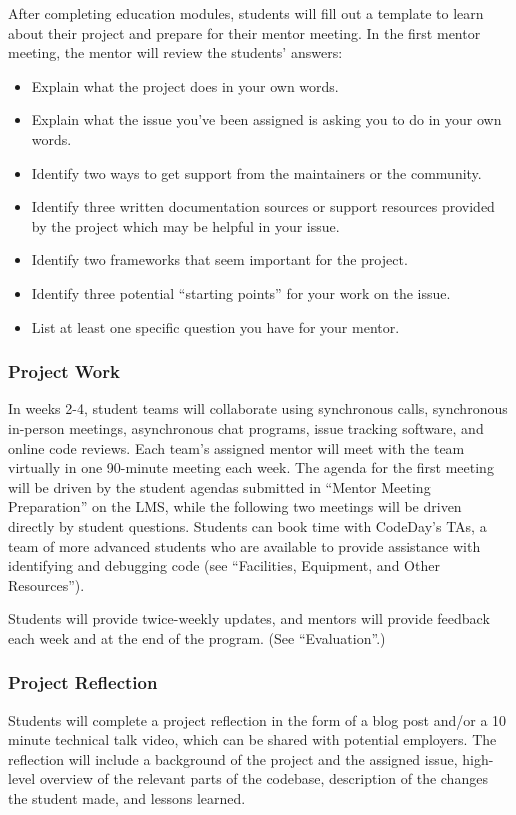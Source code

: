 After completing education modules, students will fill out a template to learn about their project and prepare for their mentor meeting. In the first mentor meeting, the mentor will review the students' answers:

\begin{itemize}
    \item Explain what the project does in your own words.
    \item Explain what the issue you've been assigned is asking you to do in your own words.
    \item Identify two ways to get support from the maintainers or the community.
    \item Identify three written documentation sources or support resources provided by the project which may be helpful in your issue.
    \item Identify two frameworks that seem important for the project.
    \item Identify three potential ``starting points'' for your work on the issue.
    \item List at least one specific question you have for your mentor.
\end{itemize}

\subsubsection{Project Work}

In weeks 2-4, student teams will collaborate using synchronous calls, synchronous in-person meetings, asynchronous chat programs, issue tracking software, and online code reviews. Each team's assigned mentor will meet with the team virtually in one 90-minute meeting each week. The agenda for the first meeting will be driven by the student agendas submitted in ``Mentor Meeting Preparation'' on the LMS, while the following two meetings will be driven directly by student questions. Students can book time with CodeDay's TAs, a team of more advanced students who are available to provide assistance with identifying and debugging code (see ``Facilities, Equipment, and Other Resources'').

Students will provide twice-weekly updates, and mentors will provide feedback each week and at the end of the program. (See ``Evaluation''.)

\subsubsection{Project Reflection}

Students will complete a project reflection in the form of a blog post and/or a 10 minute technical talk video, which can be shared with potential employers. The reflection will include a background of the project and the assigned issue, high-level overview of the relevant parts of the codebase, description of the changes the student made, and lessons learned.